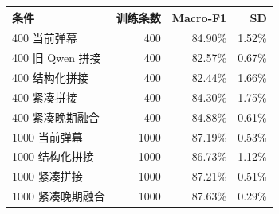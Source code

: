 \begin{tabular}{lrrr}
\toprule
条件 & 训练条数 & Macro-F1 & SD\\
\midrule
400 当前弹幕 & 400 & 84.90\% & 1.52\%\\
400 旧 Qwen 拼接 & 400 & 82.57\% & 0.67\%\\
400 结构化拼接 & 400 & 82.44\% & 1.66\%\\
400 紧凑拼接 & 400 & 84.30\% & 1.75\%\\
400 紧凑晚期融合 & 400 & 84.88\% & 0.61\%\\
1000 当前弹幕 & 1000 & 87.19\% & 0.53\%\\
1000 结构化拼接 & 1000 & 86.73\% & 1.12\%\\
1000 紧凑拼接 & 1000 & 87.21\% & 0.51\%\\
1000 紧凑晚期融合 & 1000 & 87.63\% & 0.29\%\\
\bottomrule
\end{tabular}
